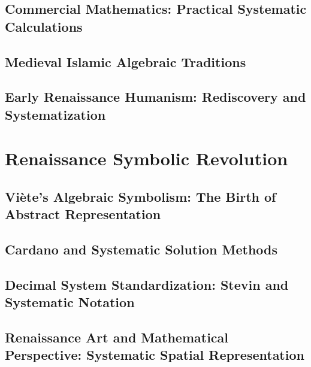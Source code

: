 \documentclass[12pt, oneside, openany]{book}
\begin{document}
\section{Commercial Mathematics: Practical Systematic Calculations}

\section{Medieval Islamic Algebraic Traditions}

\section{Early Renaissance Humanism: Rediscovery and Systematization}


\chapter{Renaissance Symbolic Revolution}

\section{Viète's Algebraic Symbolism: The Birth of Abstract Representation}

\section{Cardano and Systematic Solution Methods}

\section{Decimal System Standardization: Stevin and Systematic Notation}

\section{Renaissance Art and Mathematical Perspective: Systematic Spatial Representation}
\end{document}
